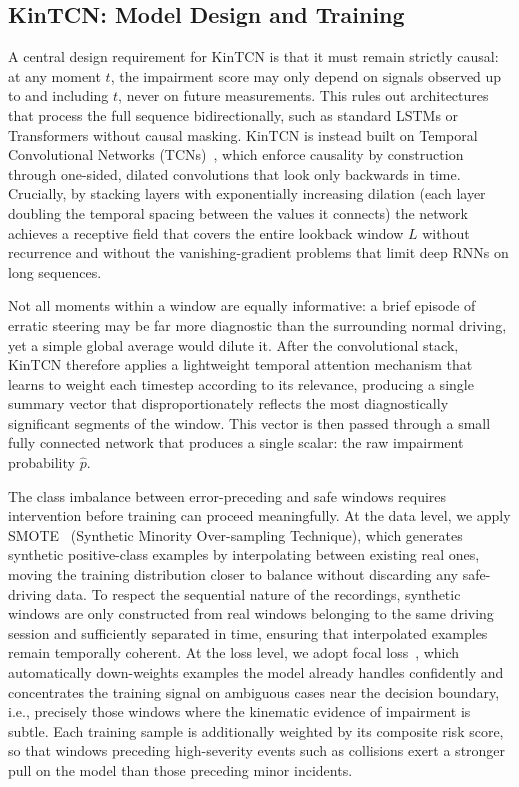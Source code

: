 \subsection{KinTCN: Model Design and Training}
\label{sec:training}

A central design requirement for KinTCN is that it must remain strictly causal:
at any moment $t$, the impairment score may only depend on signals observed up
to and including $t$, never on future measurements.
This rules out architectures that process the full sequence bidirectionally, such
as standard LSTMs or Transformers without causal masking.
KinTCN is instead built on Temporal Convolutional Networks
(TCNs)~\cite{Bai2018}, which enforce causality by construction through
one-sided, dilated convolutions that look only backwards in time.
Crucially, by stacking layers with exponentially increasing dilation (each
layer doubling the temporal spacing between the values it connects) the network
achieves a receptive field that covers the entire lookback window $L$ without
recurrence and without the vanishing-gradient problems that limit deep RNNs on
long sequences.

Not all moments within a window are equally informative: a brief episode of
erratic steering may be far more diagnostic than the surrounding normal driving,
yet a simple global average would dilute it.
After the convolutional stack, KinTCN therefore applies a lightweight temporal
attention mechanism that learns to weight each timestep according to its
relevance, producing a single summary vector that disproportionately reflects
the most diagnostically significant segments of the window.
This vector is then passed through a small fully connected network that produces
a single scalar: the raw impairment probability $\hat{p}$.

The class imbalance between error-preceding and safe windows requires
intervention before training can proceed meaningfully.
At the data level, we apply SMOTE~\cite{Chawla2002} (Synthetic Minority
Over-sampling Technique), which generates synthetic positive-class examples by
interpolating between existing real ones, moving the training distribution
closer to balance without discarding any safe-driving data.
To respect the sequential nature of the recordings, synthetic windows are only
constructed from real windows belonging to the same driving session and
sufficiently separated in time, ensuring that interpolated examples remain
temporally coherent.
At the loss level, we adopt focal loss~\cite{Lin2017}, which automatically
down-weights examples the model already handles confidently and concentrates the
training signal on ambiguous cases near the decision boundary, i.e., precisely
those windows where the kinematic evidence of impairment is subtle.
Each training sample is additionally weighted by its composite risk score, so
that windows preceding high-severity events such as collisions exert a stronger
pull on the model than those preceding minor incidents.

